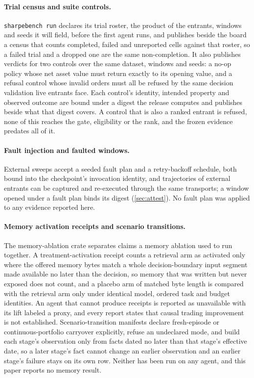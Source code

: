 \paragraph{Trial census and suite controls.} \texttt{sharpebench run} declares its trial roster, the product of the entrants, windows and seeds it will field, before the first agent runs, and publishes beside the board a census that counts completed, failed and unreported cells against that roster, so a failed trial and a dropped one are the same non-completion. It also publishes verdicts for two controls over the same dataset, windows and seeds: a no-op policy whose net asset value must return exactly to its opening value, and a refusal control whose invalid orders must all be refused by the same decision validation live entrants face. Each control's identity, intended property and observed outcome are bound under a digest the release computes and publishes beside what that digest covers. A control that is also a ranked entrant is refused, none of this reaches the gate, eligibility or the rank, and the frozen evidence predates all of it.

\paragraph{Fault injection and faulted windows.} External sweeps accept a seeded fault plan and a retry-backoff schedule, both bound into the checkpoint's invocation identity, and trajectories of external entrants can be captured and re-executed through the same transports; a window opened under a fault plan binds its digest (\cref{sec:attest}). No fault plan was applied to any evidence reported here.

\paragraph{Memory activation receipts and scenario transitions.} The memory-ablation crate separates claims a memory ablation used to run together. A treatment-activation receipt counts a retrieval arm as activated only where the offered memory bytes match a whole decision-boundary input segment made available no later than the decision, so memory that was written but never exposed does not count, and a placebo arm of matched byte length is compared with the retrieval arm only under identical model, ordered task and budget identities. An agent that cannot produce receipts is reported as unavailable with its lift labeled a proxy, and every report states that causal trading improvement is not established. Scenario-transition manifests declare fresh-episode or continuous-portfolio carryover explicitly, refuse an undeclared mode, and build each stage's observation only from facts dated no later than that stage's effective date, so a later stage's fact cannot change an earlier observation and an earlier stage's failure stays on its own row. Neither has been run on any agent, and this paper reports no memory result.

